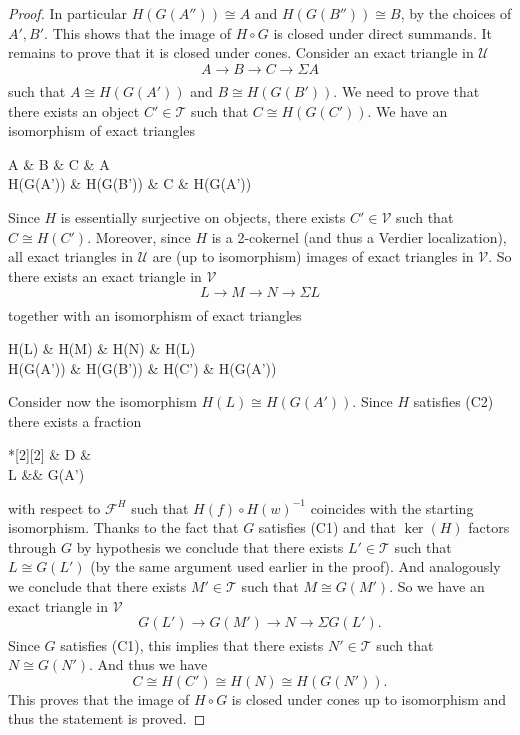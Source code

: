 \documentclass[11pt,reqno,a4paper]{amsart}
\theoremstyle{definition}
\theoremstyle{remark}
\newcommand{\T}{\mathcal{T}}
\newcommand{\U}{\mathcal{U}}
\newcommand{\V}{\mathcal{V}}
\newcommand{\F}{\mathcal{F}}
\newcommand{\0}{\mathbf{0}}
\renewcommand{\1}{\mathbf{1}}
\def\c{\circ}
\newcommand{\iso}{\cong}
\newcommand{\aar}[2][]{\xrightarrow[#1]{#2}}
\newcommand{\aiso}[1]{\overset{#1}{\iso}}
\begin{document}
\begin{proof}
    In particular $H(G(A''))\cong A$ and $H(G(B''))\cong B$, by the choices of $A',B'$. This shows that the image of $H\c G$ is closed under direct summands. It remains to prove that it is closed under cones. Consider an exact triangle in $\U$
 $$A \aar{} B \aar{} C \aar{} \Sigma A$$
 such that $A\aiso{} H(G(A'))$ and $B\aiso{} H(G(B'))$. We need to prove that there exists an object $C'\in\T$ such that $C\aiso{} H(G(C'))$. We have an isomorphism of exact triangles
 \begin{cd}[5][5]
     A \& B \& C \& {\Sigma A} \\
	{H(G(A'))} \& {H(G(B'))} \& C \& {\Sigma H(G(A'))}
	\arrow[from=1-1, to=1-2]
	\arrow[from=1-1, to=2-1, iso]
	\arrow[from=1-2, to=1-3]
	\arrow[from=1-2, to=2-2, iso]
	\arrow[from=1-3, to=1-4]
	\arrow[equals, from=1-3, to=2-3]
	\arrow[from=1-4, to=2-4, iso]
	\arrow[from=2-1, to=2-2]
	\arrow[from=2-2, to=2-3]
	\arrow[from=2-3, to=2-4]
 \end{cd}
 Since $H$ is essentially surjective on objects, there exists $C'\in \V$ such that $C\aiso{} H(C')$. Moreover, since $H$ is a 2-cokernel (and thus a Verdier localization), all exact triangles in $\U$ are (up to isomorphism) images of exact triangles in $\V$. So there exists an exact triangle in $\V$
 $$L \aar{} M \aar{} {N} \aar{} \Sigma L$$
 together with an isomorphism of exact triangles
 \begin{cd}
     {H(L)} \& {H(M)} \& {H(N)} \& {\Sigma H(L)} \\
	{H(G(A'))} \& {H(G(B'))} \& {H(C')} \& {\Sigma H(G(A'))}
	\arrow[from=1-1, to=1-2]
	\arrow[from=1-1, to=2-1,iso]
	\arrow[from=1-2, to=1-3]
	\arrow[from=1-2, to=2-2, iso]
	\arrow[from=1-3, to=1-4]
	\arrow[iso, from=1-3, to=2-3]
	\arrow[from=1-4, to=2-4, iso]
	\arrow[from=2-1, to=2-2]
	\arrow[from=2-2, to=2-3]
	\arrow[from=2-3, to=2-4]
 \end{cd}
 Consider now the isomorphism $H(L) \aiso{} H(G(A'))$. Since $H$ satisfies (C2) there exists a fraction \begin{cd}*[2][2] \& D \& \\[-2ex]
	L \&\& {G(A')}
	\arrow["w"', from=1-2, to=2-1]
	\arrow["f", from=1-2, to=2-3]\end{cd}
 with respect to $\F^H$ such that $H(f) \c H(w)^{-1}$ coincides with the starting isomorphism. Thanks to the fact that $G$ satisfies (C1) and that $\ker(H)$ factors through $G$ by hypothesis we conclude that there exists $L'\in \T$ such that $L \aiso{} G(L')$ (by the same argument used earlier in the proof). And analogously we conclude that there exists $M'\in \T$ such that $M \aiso{} G(M')$. So we have an exact triangle in $\V$
 $$G(L') \aar{} G(M') \aar{} N \aar{} \Sigma G(L').$$
 Since $G$ satisfies (C1), this implies that there exists $N'\in \T$ such that $N \aiso{} G(N')$. And thus we have
 $$C \aiso{} H(C') \aiso{} H(N) \aiso{} H(G(N')).$$
 This proves that the image of $H\c G$ is closed under cones up to isomorphism and thus the statement is proved.
\end{proof}
\end{document}
